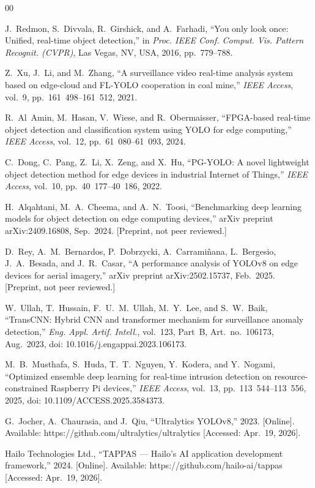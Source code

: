 \documentclass{ieeeaccess}
\begin{document}
\begin{thebibliography}{00}

 J.~Redmon, S.~Divvala, R.~Girshick, and A.~Farhadi, ``You only look once: Unified, real-time object detection,'' in \emph{Proc. IEEE Conf. Comput. Vis. Pattern Recognit. (CVPR)}, Las Vegas, NV, USA, 2016, pp.~779--788.

 Z.~Xu, J.~Li, and M.~Zhang, ``A surveillance video real-time analysis system based on edge-cloud and FL-YOLO cooperation in coal mine,'' \emph{IEEE Access}, vol.~9, pp.~161~498--161~512, 2021.

 R.~Al~Amin, M.~Hasan, V.~Wiese, and R.~Obermaisser, ``FPGA-based real-time object detection and classification system using YOLO for edge computing,'' \emph{IEEE Access}, vol.~12, pp.~61~080--61~093, 2024.

 C.~Dong, C.~Pang, Z.~Li, X.~Zeng, and X.~Hu, ``PG-YOLO: A novel lightweight object detection method for edge devices in industrial Internet of Things,'' \emph{IEEE Access}, vol.~10, pp.~40~177--40~186, 2022.

 H.~Alqahtani, M.~A.~Cheema, and A.~N.~Toosi, ``Benchmarking deep learning models for object detection on edge computing devices,'' arXiv preprint arXiv:2409.16808, Sep.~2024. [Preprint, not peer reviewed.]

 D.~Rey, A.~M.~Bernardos, P.~Dobrzycki, A.~Carrami\~{n}ana, L.~Bergesio, J.~A.~Besada, and J.~R.~Casar, ``A performance analysis of YOLOv8 on edge devices for aerial imagery,'' arXiv preprint arXiv:2502.15737, Feb.~2025. [Preprint, not peer reviewed.]

 W.~Ullah, T.~Hussain, F.~U.~M.~Ullah, M.~Y.~Lee, and S.~W.~Baik, ``TransCNN: Hybrid CNN and transformer mechanism for surveillance anomaly detection,'' \emph{Eng. Appl. Artif. Intell.}, vol.~123, Part~B, Art.~no.~106173, Aug.~2023, doi: 10.1016/j.engappai.2023.106173.

 M.~B.~Musthafa, S.~Huda, T.~T.~Nguyen, Y.~Kodera, and Y.~Nogami, ``Optimized ensemble deep learning for real-time intrusion detection on resource-constrained Raspberry Pi devices,'' \emph{IEEE Access}, vol.~13, pp.~113~544--113~556, 2025, doi: 10.1109/ACCESS.2025.3584373.

 G.~Jocher, A.~Chaurasia, and J.~Qiu, ``Ultralytics YOLOv8,'' 2023. [Online]. Available: https://github.com/ultralytics/ultralytics [Accessed: Apr.~19, 2026].

 Hailo Technologies Ltd., ``TAPPAS --- Hailo's AI application development framework,'' 2024. [Online]. Available: https://github.com/hailo-ai/tappas [Accessed: Apr.~19, 2026].


\end{thebibliography}
\end{document}
